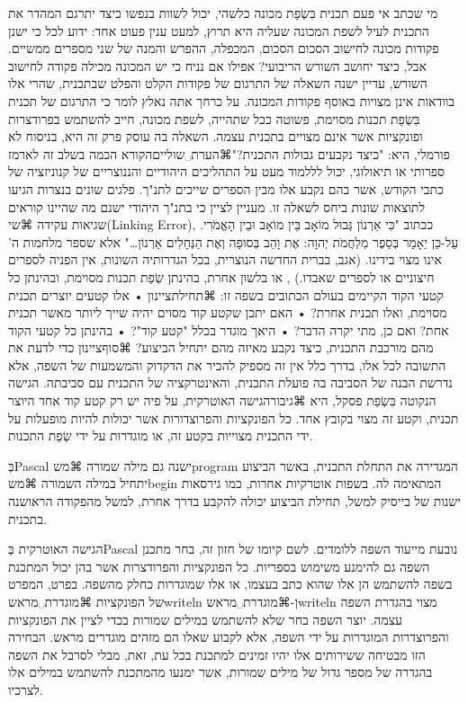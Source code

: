 {מי שכתב אי פעם תכנית בִּשְׂפַת  מכונה כלשהי, יכול לשוות בנפשו כיצד יתרגם המהדר את התכנית לעיל לשפת המכונה שעליה היא תרוץ, למעט ענין פעוט אחד: ידוע לכל כי ישנן פקודות מכונה לחישוב הסכום הסכום, המכפלה, ההפרש והמנה של שני מספרים ממשיים. אבל, כיצד יחושב השורש הריבועי? אפילו אם נניח כי יש המכונה מכילה פקודה לחישוב השורש, עדיין ישנה השאלה של התרגום של פקודות הקלט והפלט שבתכנית, שהרי אלו בוודאות אינן מצויות באוסף פקודות המכונה.
על כרחך אתה נאלץ לומר כי התרגום של תכנית בִּשְׂפַת  תכנות מסוימת, פשוטה ככל שתהייה, לשפת מכונה, חייב להשתמש בפרודצרות ופונקציות אשר אינם מצויים בתכנית עצמה. השאלה בה עוסק פרק זה היא, בניסוח לא פורמלי, היא: "כיצד נקבעים גבולות התכנית?"⌘הערת␣שוליים{הקורא הכמה בשלב זה לארמז ספרותי או תיאולוגי, יכול לללמוד מעט על התהליכים היהודיים והננוצריים של קנוניזציה של כתבי הקודש, אשר בהם נקבע אלו מבין הספרים שייכים לתנ"ך. פלגים שונים בנצרות הגיעו לתוצאות שונות ביחס לשאלה זו. מעניין לציין כי בתנ"ך היהודי ישנם מה שהיינו קוראים שגיאות עקידה ⌘שי{(Linking Error)}, ככתוב "כִּי אַרְנוֹן גְּבוּל מוֹאָב בֵּין מוֹאָב וּבֵין הָאֱמֹרִי. עַל-כֵּן יֵאָמַר בְּסֵפֶר מִלְחֲמֹת יְהוָה: אֶת וָהֵב בְּסוּפָה וְאֶת הַנְּחָלִים אַרְנוֹן…" אלא שספר מלחמות ה' אינו מצוי בידינו. (אגב, בברית החדשה הנוצרית, בכל הגדרותיה השונות, אין הפניה לספרים חיצוניים או לספרים שאבדו.)
}, או בלשון אחרת, בהינתן שְׂפַת תכנות מסוימת, ובהינתן כל קטעי הקוד הקיימים בעולם הכתובים בשפה זו:
⌘תחילת{ציינון}
• אלו קטעים יוצרים תכנית מסוימת, ואלו תכנית אחרת?
• האם יתכן שקטע קוד מסוים יהיה שייך ליותר מאשר תכנית אחת? ואם כן, מתי יקרה הדבר?
• היאך מוגדר בכלל "קטע קוד"?
• בהינתן כל קטעי הקוד מהם מורכבת התכנית, כיצד נקבע מאיזה מהם יתחיל הביצוע?
⌘סוף{ציינון}
כדי לדעת את התשובה לכל אלו, בדרך כלל אין זה מספיק להכיר את הדקדוק והמשמעות של השפה, אלא נדרשת הבנה של הסביבה בה פועלת התכנית, והאינטרקציה של התכנית עם סביבתה.
הגישה הנקוטה בִּשְׂפַת  פסקל, היא ⌘גיבור{הגישה האוטרקית}, על פיה יש רק קטע קוד אחד היוצר תכנית, וקטע זה מצוי בקובץ אחד. כל הפונקציות והפרוצדורות אשר יכולות להיות מופעלות על ידי התכנית מצוייות בקטע זה, או מוגדרות על ידי שְׂפַת התכנות.

בְּPascal ישנה גם מילה שמורה ⌘מש{program} המגדירה את התחלת התכנית, באשר הביצוע יתחיל במילה השמורה ⌘מש{begin} המתאימה לה. בשפות אוטרקיות אחרות, כמו גירסאות ישנות של בייסיק למשל, תחילת הביצוע יכולה להקבע בדרך אחרת, למשל מהפקודה הראושנה בתכנית.

הגישה האוטרקית בְּPascal נובעת מייעוד השפה ללומדים. לשם קיומו של חזון זה, בחר מתכנן השפה גם להימנע משימוש בספריות. כל הפונקציות והפרודצרות אשר בהן יכול המתכנת בשפה להשתמש הן אלו שהוא כתב בעצמו, או אלו שמוגדרות כחלק מהשפה. בפרט, המפרט של הפונקציות ⌘מוגדרת␣מראש{writeln} וְ-⌘מוגדרת␣מראש{writeln} מצוי בהגדרת השפה עצמה. יוצר השפה בחר שלא להשתמש במילים שמורות בכדי לציין את הפונקציות והפרוצדרות המוגדרות על ידי השפה, אלא לקבוע שאלו הם מזהים מוגדרים מראש. הבחירה הזו מבטיחה ששירותים אלו יהיו זמינים למתכנת בכל עת, זאת, מבלי לסרבל את השפה בהגדרה של מספר גדול של מילים שמורות, אשר ימנעו מהמתכנת להשתמש במילים אלו לצרכיו.

}
